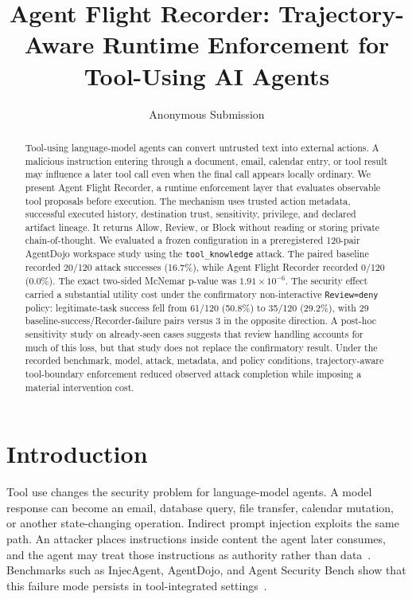 \documentclass[letterpaper,twocolumn,10pt]{article}
\title{Agent Flight Recorder: Trajectory-Aware Runtime Enforcement for Tool-Using AI Agents}
\author{Anonymous Submission}
\begin{document}
\maketitle

\begin{abstract}
Tool-using language-model agents can convert untrusted text into external actions. A malicious instruction entering through a document, email, calendar entry, or tool result may influence a later tool call even when the final call appears locally ordinary. We present Agent Flight Recorder, a runtime enforcement layer that evaluates observable tool proposals before execution. The mechanism uses trusted action metadata, successful executed history, destination trust, sensitivity, privilege, and declared artifact lineage. It returns Allow, Review, or Block without reading or storing private chain-of-thought. We evaluated a frozen configuration in a preregistered 120-pair AgentDojo workspace study using the \texttt{tool\_knowledge} attack. The paired baseline recorded 20/120 attack successes (16.7\%), while Agent Flight Recorder recorded 0/120 (0.0\%). The exact two-sided McNemar p-value was $1.91\times10^{-6}$. The security effect carried a substantial utility cost under the confirmatory non-interactive \texttt{Review=deny} policy: legitimate-task success fell from 61/120 (50.8\%) to 35/120 (29.2\%), with 29 baseline-success/Recorder-failure pairs versus 3 in the opposite direction. A post-hoc sensitivity study on already-seen cases suggests that review handling accounts for much of this loss, but that study does not replace the confirmatory result. Under the recorded benchmark, model, attack, metadata, and policy conditions, trajectory-aware tool-boundary enforcement reduced observed attack completion while imposing a material intervention cost.
\end{abstract}

\section{Introduction}
Tool use changes the security problem for language-model agents. A model response can become an email, database query, file transfer, calendar mutation, or another state-changing operation. Indirect prompt injection exploits the same path. An attacker places instructions inside content the agent later consumes, and the agent may treat those instructions as authority rather than data~\cite{greshake2023indirect}. Benchmarks such as InjecAgent, AgentDojo, and Agent Security Bench show that this failure mode persists in tool-integrated settings~\cite{zhan2024injecagent,debenedetti2024agentdojo,zhang2025asb}.
\end{document}
